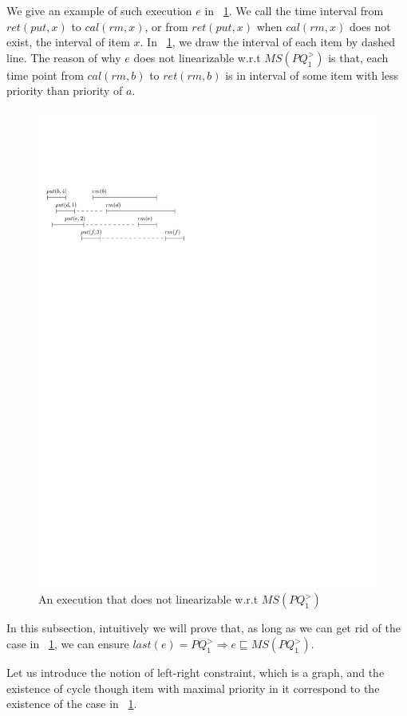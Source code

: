 We give an example of such execution $e$ in \figurename~\ref{fig:introduce gap for PQ1Lar}. We call the time interval from $\textit{ret}(\textit{put},x)$ to $\textit{cal}(rm,x)$, or from $\textit{ret}(\textit{put},x)$ when $\textit{cal}(rm,x)$ does not exist, the interval of item $x$. In \figurename~\ref{fig:introduce gap for PQ1Lar}, we draw the interval of each item by dashed line. The reason of why $e$ does not linearizable w.r.t $\textit{MS}(\textit{PQ}_1^{>})$ is that, each time point from $\textit{cal}(\textit{rm},b)$ to $\textit{ret}(\textit{rm},b)$ is in interval of some item with less priority than priority of $a$.

\begin{figure}[htbp]
  \centering
  \includegraphics[width=0.6 \textwidth]{figures/PIC-HIS-INTRO-GAP-PQ1L.pdf}
  \caption{An execution that does not linearizable w.r.t $\textit{MS}(\textit{PQ}_1^{>})$}
  \label{fig:introduce gap for PQ1Lar}
\end{figure}

In this subsection, intuitively we will prove that, as long as we can get rid of the case in \figurename~\ref{fig:introduce gap for PQ1Lar}, we can ensure $\textit{last}(e) = \textit{PQ}_1^{>} \Rightarrow e \sqsubseteq \textit{MS}(\textit{PQ}_1^{>})$.

Let us introduce the notion of left-right constraint, which is a graph, and the existence of cycle though item with maximal priority in it correspond to the existence of the case in \figurename~\ref{fig:introduce gap for PQ1Lar}.

